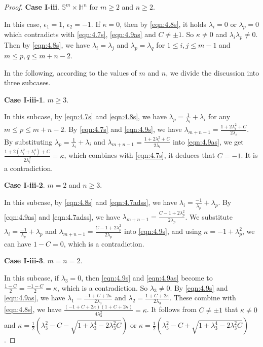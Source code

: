 \documentclass[reqno]{amsart}%
\theoremstyle{definition}
\numberwithin{equation}{section}
\begin{document}
\begin{proof}
\vskip 2mm

{\bf Case I-iii}. $\mathbb{S}^m\times\mathbb{H}^n$ for $m\geq2$ and $n\geq2$. 

In this case, $\epsilon_1=1$, $\epsilon_2=-1$.  
If $\kappa=0$, then by \eqref{eqn:4.8s}, it holds 
$\lambda_i=0$ or $\lambda_p=0$ which contradicts with \eqref{eqn:4.7s}, \eqref{eqn:4.9as} 
and $C\neq\pm1$. 
So $\kappa\neq0$ and $\lambda_i\lambda_p\neq0$. 
Then by  \eqref{eqn:4.8s}, we have $\lambda_i=\lambda_j$ and $\lambda_p=\lambda_q$ for  $1\leq i,j\leq m-1$ and $m\leq p,q\leq m+n-2$. 

In the following, according to the values of $m$ and $n$, we divide the discussion into three subcases. 

{\bf Case I-iii-1}. $m\geq 3$. 

In this subcase, by \eqref{eqn:4.7s} and
\eqref{eqn:4.8s}, we have $\lambda_p=\tfrac{1}{\lambda_i}+\lambda_i$ for any $m\leq p\leq m+n-2$. 
By \eqref{eqn:4.7s} and \eqref{eqn:4.9s}, we have 
$\lambda_{m+n-1}=\frac{1+2\lambda_i^2+C}{2\lambda_i}$.  By substituting 
$\lambda_p=\tfrac{1}{\lambda_i}+\lambda_i$ and  $\lambda_{m+n-1}=\frac{1+2\lambda_i^2+C}{2\lambda_i}$ into \eqref{eqn:4.9as}, 
we get 
$\frac{1+2(\lambda_i^2+\lambda_i^4)+C}{2\lambda_i^2}=\kappa$, which combines with 
\eqref{eqn:4.7s}, it deduces that $C=-1$. It is a contradiction. 

{\bf Case I-iii-2}. $m=2$ and $n\geq 3$. 

In this subcase, by \eqref{eqn:4.8s} and \eqref{eqn:4.7adss}, we have $\lambda_i=\tfrac{-1}{\lambda_p}+\lambda_p$. 
By \eqref{eqn:4.9as} and \eqref{eqn:4.7adss}, we have 
$\lambda_{m+n-1}=\frac{C-1+2\lambda_p^2}{2\lambda_p}$.  We substitute $\lambda_i=\tfrac{-1}{\lambda_p}+\lambda_p$ and $\lambda_{m+n-1}=\frac{C-1+2\lambda_p^2}{2\lambda_p}$ into \eqref{eqn:4.9s}, and using $\kappa=-1+\lambda_p^2$, 
we can have $1-C=0$, which is a contradiction. 

{\bf Case I-iii-3}. $m=n=2$. 

In this subcase, if $\lambda_3=0$, then \eqref{eqn:4.9s} and \eqref{eqn:4.9as} become to 
$\frac{1-C}{2}=\frac{-1-C}{2}=\kappa$, which is a contradiction. So $\lambda_3\neq0$. 
By \eqref{eqn:4.9s} and \eqref{eqn:4.9as}, we have $\lambda_1=\frac{-1+C+2\kappa}{2\lambda_3}$ and $\lambda_2=\frac{1+C+2\kappa}{2\lambda_3}$. These combine 
with \eqref{eqn:4.8s}, we have $\frac{(-1+C+2\kappa)(1+C+2\kappa)}{4\lambda_3^2}=\kappa$. 
It follows from $C\neq\pm1$ that $\kappa\neq0$ and $\kappa=\frac{1}{2}(\lambda_3^2-C-\sqrt{1+\lambda_3^4-2\lambda_3^2C})$ or $\kappa=\frac{1}{2}(\lambda_3^2-C+\sqrt{1+\lambda_3^4-2\lambda_3^2C})$. 


\end{proof}
\end{document}
